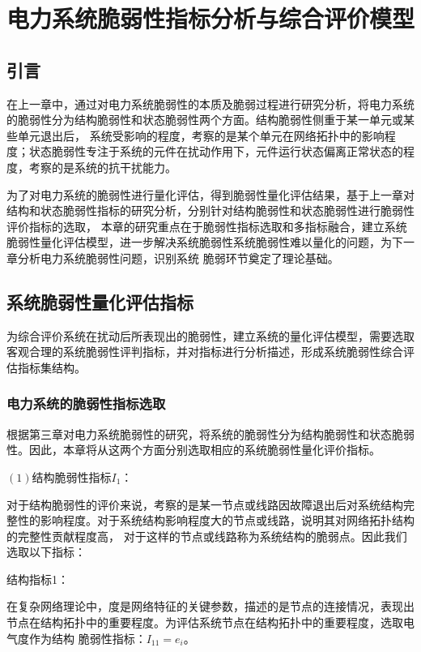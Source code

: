 \chapter{电力系统脆弱性指标分析与综合评价模型}
\label{cha:quanti}

\section{引言}
\label{sec:index4}
在上一章中，通过对电力系统脆弱性的本质及脆弱过程进行研究分析，将电力系统的脆弱性分为结构脆弱性和状态脆弱性两个方面。结构脆弱性侧重于某一单元或某些单元退出后，
系统受影响的程度，考察的是某个单元在网络拓扑中的影响程度；状态脆弱性专注于系统的元件在扰动作用下，元件运行状态偏离正常状态的程度，考察的是系统的抗干扰能力。

为了对电力系统的脆弱性进行量化评估，得到脆弱性量化评估结果，基于上一章对结构和状态脆弱性指标的研究分析，分别针对结构脆弱性和状态脆弱性进行脆弱性评价指标的选取，
本章的研究重点在于脆弱性指标选取和多指标融合，建立系统脆弱性量化评估模型，进一步解决系统脆弱性系统脆弱性难以量化的问题，为下一章分析电力系统脆弱性问题，识别系统
脆弱环节奠定了理论基础。

\section{系统脆弱性量化评估指标}
\label{sec:describIndex}
为综合评价系统在扰动后所表现出的脆弱性，建立系统的量化评估模型，需要选取客观合理的系统脆弱性评判指标，并对指标进行分析描述，形成系统脆弱性综合评估指标集结构。



\subsection{电力系统的脆弱性指标选取}
\label{sec:pickIndex}
根据第三章对电力系统脆弱性的研究，将系统的脆弱性分为结构脆弱性和状态脆弱性。因此，本章将从这两个方面分别选取相应的系统脆弱性量化评价指标。

$(1)$结构脆弱性指标$I_1$：

对于结构脆弱性的评价来说，考察的是某一节点或线路因故障退出后对系统结构完整性的影响程度。对于系统结构影响程度大的节点或线路，说明其对网络拓扑结构的完整性贡献程度高，
对于这样的节点或线路称为系统结构的脆弱点。因此我们选取以下指标：

结构指标1：

在复杂网络理论中，度是网络特征的关键参数，描述的是节点的连接情况，表现出节点在结构拓扑中的重要程度。为评估系统节点在结构拓扑中的重要程度，选取电气度作为结构
脆弱性指标：$I_{11} = e_{i}$。


